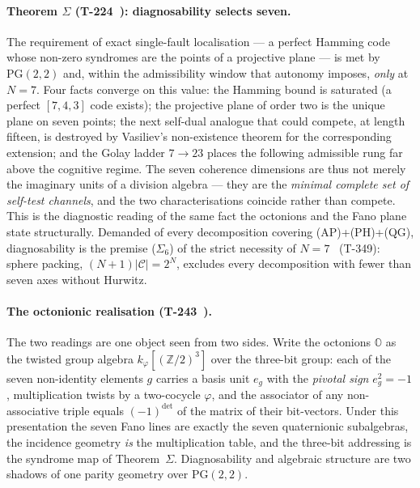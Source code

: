 \paragraph{Theorem $\Sigma$ (T-224~): diagnosability selects seven.}
The requirement of exact single-fault localisation --- a perfect Hamming code
whose non-zero syndromes are the points of a projective plane --- is met by
$\mathrm{PG}(2,2)$ and, within the admissibility window that autonomy imposes,
\emph{only} at $N = 7$. Four facts converge on this value: the Hamming bound is
saturated (a perfect $[7,4,3]$ code exists); the projective plane of order two is
the unique plane on seven points; the next self-dual analogue that could compete,
at length fifteen, is destroyed by Vasiliev's non-existence theorem for the
corresponding extension; and the Golay ladder $7 \to 23$ places the following
admissible rung far above the cognitive regime. The seven coherence dimensions are
thus not merely the imaginary units of a division algebra --- they are the
\emph{minimal complete set of self-test channels}, and the two characterisations
coincide rather than compete. This is the diagnostic reading of the same fact the
octonions and the Fano plane state structurally. Demanded of every decomposition
covering (AP)+(PH)+(QG), diagnosability is the premise ($\Sigma_6$) of the strict
necessity of $N = 7$~ (T-349): sphere packing,
$(N+1)\lvert\mathcal C\rvert = 2^N$, excludes every decomposition with fewer than seven
axes without Hurwitz.

\paragraph{The octonionic realisation (T-243~).}
The two readings are one object seen from two sides. Write the octonions
$\mathbb{O}$ as the twisted group algebra $k_\varphi[(\mathbb{Z}/2)^3]$ over the
three-bit group: each of the seven non-identity elements $g$ carries a basis unit
$e_g$ with the \emph{pivotal sign} $e_g^2 = -1$, multiplication twists by a
two-cocycle $\varphi$, and the associator of any non-associative triple equals
$(-1)^{\det}$ of the matrix of their bit-vectors. Under this presentation the seven
Fano lines are exactly the seven quaternionic subalgebras, the incidence geometry
\emph{is} the multiplication table, and the three-bit addressing is the syndrome
map of Theorem~$\Sigma$. Diagnosability and algebraic structure are two shadows of
one parity geometry over $\mathrm{PG}(2,2)$.

